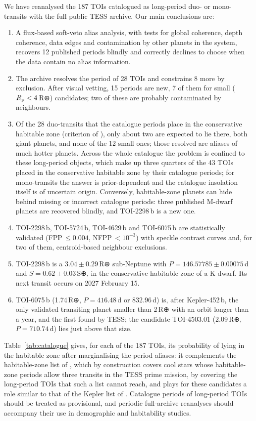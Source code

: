 \documentclass[fleqn,usenatbib]{mnras}
\newcommand{\Rp}{\ensuremath{R_{\rm p}}}
\begin{document}
We have reanalysed the 187 TOIs catalogued as long-period duo- or mono-transits with the full public TESS archive. Our main conclusions are:
\begin{enumerate}
\item A flux-based soft-veto alias analysis, with tests for global coherence, depth coherence, data edges and contamination by other planets in the system, recovers 12 published periods blindly and correctly declines to choose when the data contain no alias information.
\item The archive resolves the period of 28 TOIs and constrains 8 more by exclusion. After visual vetting, 15 periods are new, 7 of them for small ($\Rp < 4$\,R⊕) candidates; two of these are probably contaminated by neighbours.
\item Of the 28 duo-transits that the catalogue periods place in the conservative habitable zone (criterion of \citealt{Kaltenegger2021}), only about two are expected to lie there, both giant planets, and none of the 12 small ones; those resolved are aliases of much hotter planets. Across the whole catalogue the problem is confined to these long-period objects, which make up three quarters of the 43 TOIs placed in the conservative habitable zone by their catalogue periods; for mono-transits the answer is prior-dependent and the catalogue insolation itself is of uncertain origin. Conversely, habitable-zone planets can hide behind missing or incorrect catalogue periods: three published M-dwarf planets are recovered blindly, and TOI-2298\,b is a new one.
\item TOI-2298\,b, TOI-5724\,b, TOI-4629\,b and TOI-6075\,b are statistically validated (FPP\,$\leq 0.004$, NFPP\,$< 10^{-3}$) with speckle contrast curves and, for two of them, centroid-based neighbour exclusions.
\item TOI-2298\,b is a $3.04 \pm 0.29$\,R⊕ sub-Neptune with $P = 146.57785 \pm 0.00075$\,d and $S = 0.62 \pm 0.03$\,S⊕, in the conservative habitable zone of a K dwarf. Its next transit occurs on 2027 February 15.
\item TOI-6075\,b (1.74\,R⊕, $P = 416.48$\,d or 832.96\,d) is, after Kepler-452\,b, the only validated transiting planet smaller than 2\,R⊕ with an orbit longer than a year, and the first found by TESS; the candidate TOI-4503.01 (2.09\,R⊕, $P = 710.74$\,d) lies just above that size.
\end{enumerate}

Table~\ref{tab:catalogue} gives, for each of the 187 TOIs, its probability of lying in the habitable zone after marginalising the period aliases: it complements the habitable-zone list of \citet{Kaltenegger2021}, which by construction covers cool stars whose habitable-zone periods allow three transits in the TESS prime mission, by covering the long-period TOIs that such a list cannot reach, and plays for these candidates a role similar to that of the Kepler list of \citet{Kane2016}. Catalogue periods of long-period TOIs should be treated as provisional, and periodic full-archive reanalyses should accompany their use in demographic and habitability studies.
\end{document}
